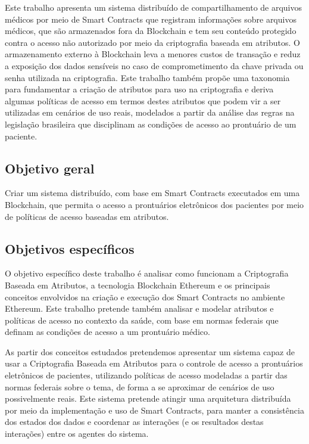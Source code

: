 \documentclass[a4paper,11pt]{article}
\begin{document}
Este trabalho apresenta um sistema distribuído de compartilhamento de arquivos médicos por meio de Smart Contracts que registram informações sobre arquivos médicos, que são armazenados fora da Blockchain e tem seu conteúdo protegido contra o acesso não autorizado por meio da criptografia baseada em atributos.
O armazenamento externo à Blockchain leva a menores custos de transação e reduz a exposição dos dados sensíveis no caso de comprometimento da chave privada ou senha utilizada na criptografia.
Este trabalho também propõe uma taxonomia para fundamentar a criação de atributos para uso na criptografia e deriva algumas políticas de acesso em termos destes atributos que podem vir a ser utilizadas em cenários de uso reais, modelados a partir da análise das regras na legislação brasileira que disciplinam as condições de acesso ao prontuário de um paciente.

\subsection{Objetivo geral}

Criar um sistema distribuído, com base em Smart Contracts executados em uma Blockchain, que permita o acesso a prontuários eletrônicos dos pacientes por meio de políticas de acesso baseadas em atributos.

\subsection{Objetivos específicos}

O objetivo específico deste trabalho é analisar como funcionam a Criptografia Baseada em Atributos, a tecnologia Blockchain Ethereum e os principais conceitos envolvidos na criação e execução dos Smart Contracts no ambiente Ethereum.
Este trabalho pretende também analisar e modelar atributos e políticas de acesso no contexto da saúde, com base em normas federais que definam as condições de acesso a um prontuário médico.

As partir dos conceitos estudados pretendemos apresentar um sistema capaz de usar a Criptografia Baseada em Atributos para o controle de acesso a prontuários eletrônicos de pacientes, utilizando políticas de acesso modeladas a partir das normas federais sobre o tema, de forma a se aproximar de cenários de uso possivelmente reais.
Este sistema pretende atingir uma arquitetura distribuída por meio da implementação e uso de Smart Contracts, para manter a consistência dos estados dos dados e coordenar as interações (e os resultados destas interações) entre os agentes do sistema.
\end{document}
